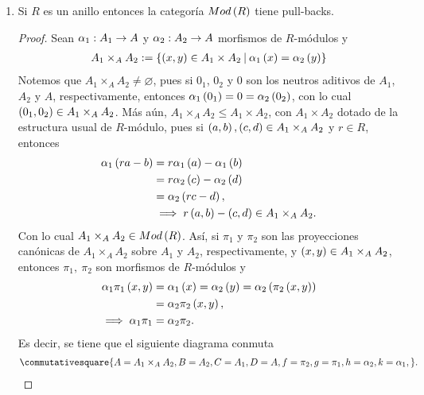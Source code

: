 \documentclass{article}
\begin{document}
\begin{enumerate}[label=\textbf{Ej \arabic*.}]
\begin{proof}
		\begin{equation*}
			\commutativesquare{up=t,pp=l,P=A_2,A=P,B=A_2,C=A_1,D=A,f=\beta_2,g=\beta_1,h=\alpha_2,k=\alpha_1,l=1_{A_2},m=\delta,n=\exists !\ \gamma,},
		\end{equation*}
		del cual se sigue en partícular que $\gamma\beta_2=1_{A_2}$.
	\end{proof}
		\item Si $R$ es un anillo entonces la categoría $Mod\left(R\right)$ tiene pull-backs.
		\begin{proof}
			Sean $\alpha_1:A_1\to A$ y $\alpha_2:A_2\to A$ morfismos de $R$-módulos y
			\begin{align*}
				A_1\times_{A} A_2:=\descset{\lrprth{x,y}}{A_1\times A_2}{\alpha_1\lrprth{x}=\alpha_2\lrprth{y}}
			\end{align*}
			\renewcommand{\copyandpaste}{A_1\times_{A} A_2}
			Notemos que $\copyandpaste\neq\varnothing$, pues si $0_1$, $0_2$ y $0$ son los neutros aditivos de $A_1$, $A_2$ y $A$, respectivamente, entonces $\alpha_1\left(0_1\right)=0=\alpha_2\left(0_2\right)$, con lo cual $\lrprth{0_1,0_2}\in\copyandpaste$. Más aún, $\copyandpaste\leq A_1\times A_2$, con $A_1\times A_2$ dotado de la estructura usual de $R$-módulo, pues si $\lrprth{a,b},\lrprth{c,d}\in\copyandpaste$ y $r\in R$, entonces
			\begin{align*}
				\alpha_1\lrprth{ra-b}&=r\alpha_1\lrprth{a}-\alpha_1\lrprth{b}\\
				&=r\alpha_2\lrprth{c}-\alpha_2\lrprth{d}\\
				&=\alpha_2\lrprth{rc-d},\\
				&\implies r\lrprth{a,b}-\lrprth{c,d}\in\copyandpaste.
			\end{align*}
			Con lo cual $\copyandpaste\in Mod\lrprth{R}$. Así, si $\pi_1$ y $\pi_2$ son las proyecciones canónicas de $\copyandpaste$ sobre $A_1$ y $A_2$, respectivamente, y $\lrprth{x,y}\in\copyandpaste$, entonces $\pi_1,\ \pi_2$ son morfismos de $R$-módulos y 
			\begin{align*}
				\alpha_1\pi_1\left(x,y\right)&=\alpha_1\left(x\right)=\alpha_2\left(y\right)=\alpha_2\left(\pi_2\left(x,y\right)\right)\\
				&=\alpha_2\pi_2\left(x,y\right),\\
				\implies \alpha_1\pi_1&=\alpha_2\pi_2.
			\end{align*}
			Es decir, se tiene que el siguiente diagrama conmuta
			\begin{align*}
				\commutativesquare{A=\copyandpaste,B=A_2,C=A_1,D=A,f=\pi_2,g=\pi_1,h=\alpha_2,k=\alpha_1,}.

\end{align*}
\end{proof}
\end{enumerate}
\end{document}
